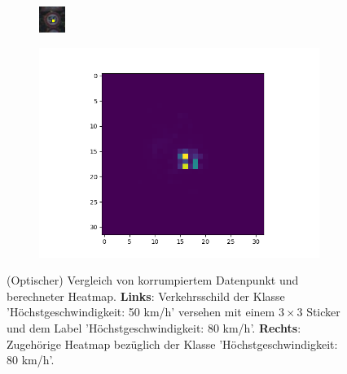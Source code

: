 \documentclass[twoside, 12pt,a4paper]{book}
\newcommand{\source}[1]{\caption*{\hfill Quelle: {#1}} }
\numberwithin{equation}{section}
\begin{document}
	\begin{figure}
		\centering
		\begin{subfigure}{.5\textwidth}
			\centering
			\includegraphics[width=.4\linewidth]{1450_poison}
			
		\end{subfigure}%
		\begin{subfigure}{.5\textwidth}
			\centering
			\includegraphics[width=.7\linewidth]{1450_poison_lrp.png}
			
		\end{subfigure}
		\caption[(Optischer) Vergleich von korrumpiertem Datenpunkt und berechneter Heatmap.]{(Optischer) Vergleich von korrumpiertem Datenpunkt und berechneter Heatmap. \textbf{Links}: Verkehrsschild der Klasse 'Höchstgeschwindigkeit: 50 km/h' versehen mit einem $3\times 3$ Sticker und dem Label 'Höchstgeschwindigkeit: 80 km/h'. \textbf{Rechts}: Zugehörige Heatmap bezüglich der Klasse 'Höchstgeschwindigkeit: 80 km/h'.}
		
		\label{vergleich_original_lrp}
	\end{figure}
	
\end{document}

